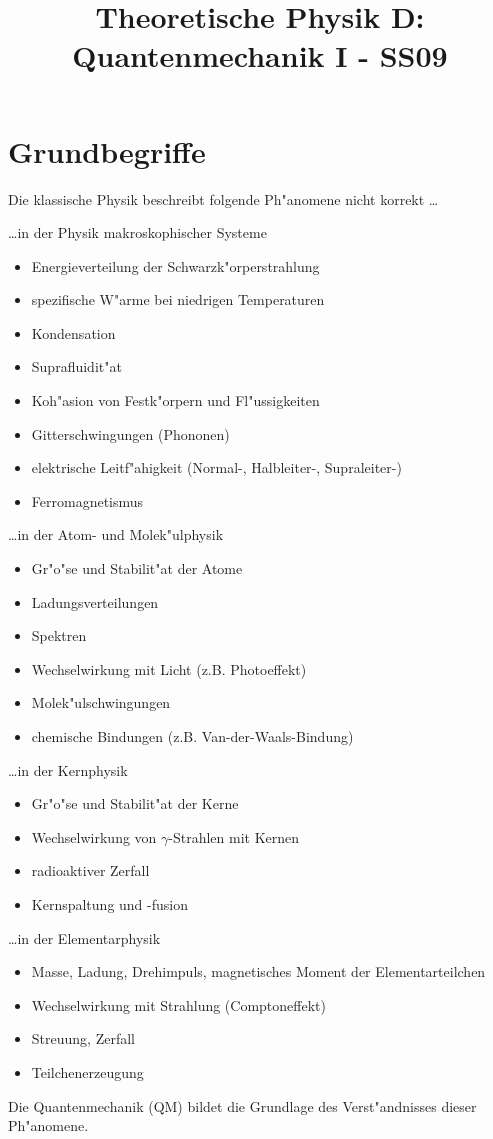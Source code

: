 \documentclass[a4paper]{scrartcl}
\begin{document}
\title{ Theoretische Physik D: Quantenmechanik I - SS09}
\date{}
\maketitle
\tableofcontents
\section{Grundbegriffe}

Die klassische Physik beschreibt folgende Ph"anomene nicht korrekt \ldots
\begin{aaufz}
	\item \ldots in der Physik makroskophischer Systeme
	\begin{itemize}
		\item Energieverteilung der Schwarzk"orperstrahlung
		\item spezifische W"arme bei niedrigen Temperaturen
		\item Kondensation
		\item Suprafluidit"at
		\item Koh"asion von Festk"orpern und Fl"ussigkeiten
		\item Gitterschwingungen (Phononen)
		\item elektrische Leitf"ahigkeit (Normal-, Halbleiter-, Supraleiter-)
		\item Ferromagnetismus
	\end{itemize}
	\item \ldots in der Atom- und Molek"ulphysik
	\begin{itemize}
		\item Gr"o"se und Stabilit"at der Atome
		\item Ladungsverteilungen
		\item Spektren
		\item Wechselwirkung mit Licht (z.B. Photoeffekt)
		\item Molek"ulschwingungen 
		\item chemische Bindungen (z.B. Van-der-Waals-Bindung)
	\end{itemize}
	\item \ldots in der Kernphysik
	\begin{itemize}
		\item Gr"o"se und Stabilit"at der Kerne
		\item Wechselwirkung von $\gamma$-Strahlen mit Kernen 
		\item radioaktiver Zerfall
		\item Kernspaltung und -fusion
	\end{itemize}
	\item \ldots in der Elementarphysik
	\begin{itemize}
	\item Masse, Ladung, Drehimpuls, magnetisches Moment der Elementarteilchen
	\item Wechselwirkung mit Strahlung (Comptoneffekt)
	\item Streuung, Zerfall
	\item Teilchenerzeugung
	\end{itemize}
\end{aaufz}
Die Quantenmechanik (QM) bildet die Grundlage des Verst"andnisses dieser Ph"anomene.
\end{document}

